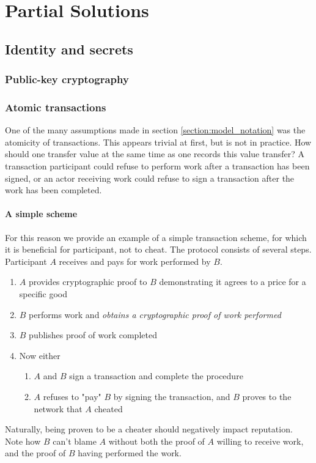 \chapter{Partial Solutions}
\section{Identity and secrets}
\subsection{Public-key cryptography}

\subsection{Atomic transactions}
One of the many assumptions made in section \ref{section:model_notation} was the atomicity of transactions. 
This appears trivial at first, but is not in practice. 
How should one transfer value at the same time as one records this value transfer? 
A transaction participant could refuse to perform work after a transaction has been signed, 
or an actor receiving work could refuse to sign a transaction after the work has been completed.

\subsubsection{A simple scheme}
For this reason we provide an example of a simple transaction scheme, 
for which it is beneficial for participant, not to cheat. 
The protocol consists of several steps. 
Participant $A$ receives and pays for work performed by $B$.
\begin{enumerate}
	\item $A$ provides cryptographic proof to $B$ demonstrating it agrees to a price for a specific good
	\item \label{atomic_transactions_enumerate_proof_of_work}$B$ performs work and \emph{obtains a cryptographic proof of work performed}
	\item $B$ publishes proof of work completed
	\item Now either 
	\begin{enumerate}
		\item $A$ and $B$ sign a transaction and complete the procedure
		\item $A$ refuses to "pay" $B$ by signing the transaction, 
		and $B$ proves to the network that $A$ cheated
	\end{enumerate}
\end{enumerate}
Naturally, being proven to be a cheater should negatively impact reputation. 
Note how $B$ can't blame $A$ without both the proof of $A$ willing to receive work, 
and the proof of $B$ having performed the work.

